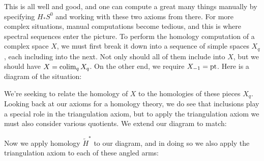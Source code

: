 This is all well and good, and one can compute a great many things manually by specifying $H_* S^0$ and working with these two axioms from there.  For more complex situations, manual computations become tedious, and this is where spectral sequences enter the picture.  To perform the homology computation of a complex space $X$, we must first break it down into a sequence of simple spaces $X_q$, each including into the next.  Not only should all of them include into $X$, but we should have $X = \operatorname{colim}_q X_q$.  On the other end, we require $X_{-1} = \operatorname{pt}$.  Here is a diagram of the situation:
\begin{center}
\end{center}
We're seeking to relate the homology of $X$ to the homologies of these pieces $X_q$.  Looking back at our axioms for a homology theory, we do see that inclusions play a special role in the triangulation axiom, but to apply the triangulation axiom we must also consider various quotients.  We extend our diagram to match:
\begin{center}
\end{center}
Now we apply homology $\tilde H^*$ to our diagram, and in doing so we also apply the triangulation axiom to each of these angled arms:
